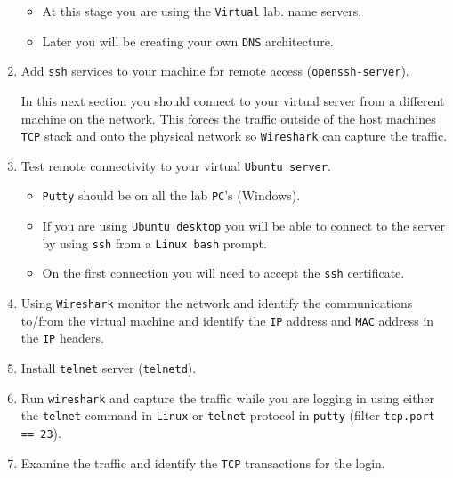 \documentclass[11pt]{article}
\begin{document}
\begin{enumerate}
        \begin{tcolorbox}[title={\textbf{Notes:}}]
            \begin{itemize}
                \item At this stage you are using the \texttt{Virtual} lab. name servers.
                \item Later you will be creating your own \texttt{DNS} architecture.
            \end{itemize}
        \end{tcolorbox}
    \item Add \texttt{ssh} services to your machine for remote access (\texttt{openssh-server}).
        \begin{tcolorbox}[colback=blue!20]
            In this next section you should connect to your virtual server from a different machine on the network. This forces the traffic outside of the host machines \texttt{TCP} stack and onto the physical network so \texttt{Wireshark} can capture the traffic.
        \end{tcolorbox}
    \item Test remote connectivity to your virtual \texttt{Ubuntu server}.
        \begin{tcolorbox}[title={\textbf{Notes:}}]
            \begin{itemize}
                \item \texttt{Putty} should be on all the lab \texttt{PC}'s (Windows).
                \item If you are using \texttt{Ubuntu desktop} you will be able to connect to the server by using \texttt{ssh} from a \texttt{Linux bash} prompt.
                \item On the first connection you will need to accept the \texttt{ssh} certificate.
            \end{itemize}
        \end{tcolorbox}
    \item Using \texttt{Wireshark} monitor the network and identify the communications to/from the virtual machine and identify the \texttt{IP} address and \texttt{MAC} address in the \texttt{IP} headers.
    \item Install \texttt{telnet} server (\texttt{telnetd}).
    \item Run \texttt{wireshark} and capture the traffic while you are logging in using either the \texttt{telnet} command in \texttt{Linux} or \texttt{telnet} protocol in \texttt{putty} (filter \texttt{tcp.port == 23}).
    \item Examine the traffic and identify the \texttt{TCP} transactions for the login.

\end{enumerate}
\end{document}
